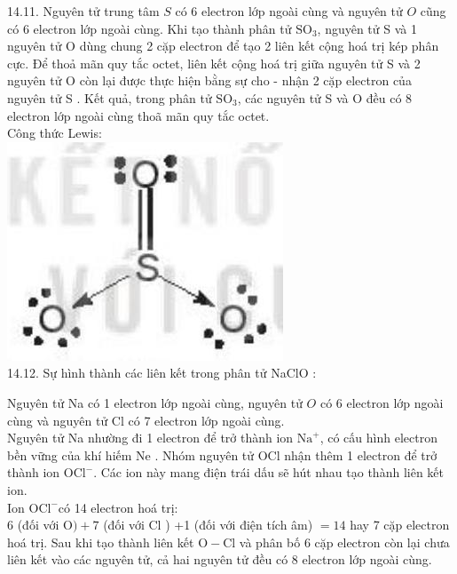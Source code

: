 \documentclass[10pt]{article}
\begin{document}
14.11. Nguyên tử trung tâm $S$ có 6 electron lớp ngoài cùng và nguyên tử $O$ cũng có 6 electron lớp ngoài cùng. Khi tạo thành phân tử $\mathrm{SO}_{3}$, nguyên tử S và 1 nguyên tử O dùng chung 2 cặp electron để tạo 2 liên kết cộng hoá trị kép phân cực. Để thoả mãn quy tắc octet, liên kết cộng hoá trị giữa nguyên tử S và 2 nguyên tử O còn lại được thực hiện bằng sự cho - nhận 2 cặp electron của nguyên tử S . Kết quả, trong phân tử $\mathrm{SO}_{3}$, các nguyên tử S và O đều có 8 electron lớp ngoài cùng thoã mãn quy tắc octet.\\
Công thức Lewis:\\
\includegraphics[max width=\textwidth, center]{2025_10_23_ee735750217b2aca435cg-29}\\
14.12. Sự hình thành các liên kết trong phân tử NaClO :

Nguyên tử Na có 1 electron lớp ngoài cùng, nguyên tử $O$ có 6 electron lớp ngoài cùng và nguyên tử Cl có 7 electron lớp ngoài cùng.\\
Nguyên tử Na nhường đi 1 electron để trở thành ion $\mathrm{Na}^{+}$, có cấu hình electron bền vững của khí hiếm Ne . Nhóm nguyên tử OCl nhận thêm 1 electron để trở thành ion $\mathrm{OCl}^{-}$. Các ion này mang điện trái dấu sẽ hút nhau tạo thành liên kết ion.\\
Ion $\mathrm{OCl}^{-}$có 14 electron hoá trị:\\
6 (đối với O$)+7$ (đối với Cl ) +1 (đối với điện tích âm) $=14$ hay 7 cặp electron hoá trị. Sau khi tạo thành liên kết $\mathrm{O}-\mathrm{Cl}$ và phân bố 6 cặp electron còn lại chưa liên kết vào các nguyên tử, cả hai nguyên tử đều có 8 electron lớp ngoài cùng.
\end{document}
